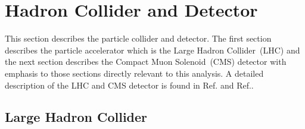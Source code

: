 \chapter{Hadron Collider and Detector}
This section describes the particle collider and detector. The first section describes the particle accelerator which is the Large Hadron Collider~(LHC) and the next section describes the Compact Muon Solenoid~(CMS) detector with emphasis to those sections directly relevant to this analysis. A detailed description of the LHC and CMS detector is found in Ref.\cite{LHC} and Ref.\cite{CMSTDR}.
\section{Large Hadron Collider}
